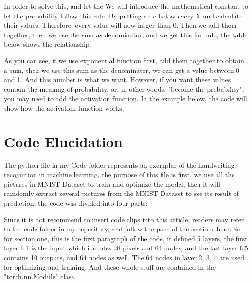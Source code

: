 \documentclass[12pt]{article}
\begin{document}
In order to solve this, and let the We will introduce  the mathematical constant to let the probability follow this rule. By putting an e below every X and calculate their values. Therefore, every value will now larger than 0. Then we add them together, then we use the sum as denominator, and we get this formula, the table below shows the relationship.

\begin{table}[h!]
\centering
{}
\caption{Softmax Normalization}
\label{table:your_label}
\end{table}

As you can see, if we use exponential function first, add them together to obtain a sum, then we use this sum as the denominator, we can get a value between 0 and 1. And this number is what we want. However, if you want these values contain the meaning of probability, or, in other words, "become the probability", you may need to add the activation function. In the example below, the code will show how the activation function works.

\section*{Code Elucidation}
The python file in my Code folder represents an exemplar of the handwriting recognition in machine learning, the purpose of this file is first, we use all the pictures in MNIST Dataset to train and optimize the model, then it will ramdomly extract several pictures from the MNIST Dataset to see its result of prediction, the code was divided into four parts:

Since it is not recommend to insert code clips into this article, readers may refer to the code folder in my repository, and follow the pace of the sections here. So for section one, this is the first paragraph of the code, it defined 5 layers, the first layer fc1 is the input which includes 28 pixels and 64 nodes, and the last layer fc5 contains 10 outputs, and 64 nodes as well. The 64 nodes in layer 2, 3, 4 are used for optimizing and training. And these whole stuff are contained in the "torch.nn.Module" class. 
\end{document}
